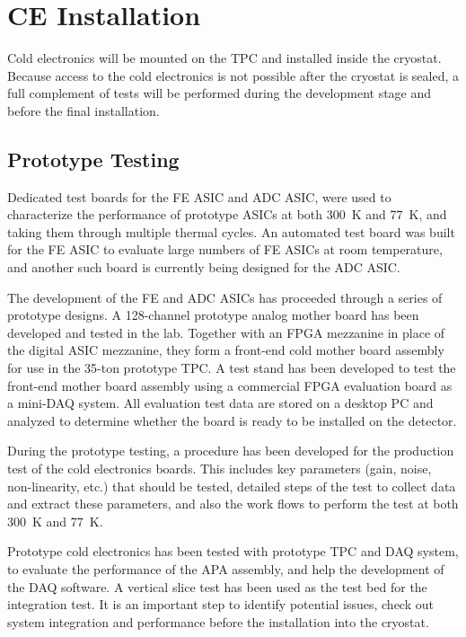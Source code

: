 %
\section{CE Installation}
\label{sec:ce_install}

Cold electronics will be mounted on the TPC and installed inside the cryostat.
Because access to the cold electronics is not possible after the cryostat is sealed,
a full complement of tests will be performed during the development stage and before the final installation.

\subsection{Prototype Testing}
\label{sec:ce_install_proto}

Dedicated test boards for the FE ASIC and ADC ASIC,
were used to characterize the performance of prototype ASICs at both 300~K and 77~K,
and taking them through multiple thermal cycles.
An automated test board was built for the FE ASIC to evaluate large numbers of FE ASICs at room temperature,
and another such board is currently being designed for the ADC ASIC.

The development of the FE and ADC ASICs has proceeded through a series of prototype designs.
A 128-channel prototype analog mother board has been developed and tested in the lab.
Together with an FPGA mezzanine in place of the digital ASIC mezzanine,
they form a front-end cold mother board assembly for use in the 35-ton prototype TPC.
A test stand has been developed to test the front-end mother board assembly
using a commercial FPGA evaluation board as a mini-DAQ system.
All evaluation test data are stored on a desktop PC and analyzed to
determine whether the board is ready to be installed on the detector.

During the prototype testing, a procedure has been developed for the production test of the cold electronics boards.
This includes key parameters (gain, noise, non-linearity, etc.) that should be tested,
detailed steps of the test to collect data and extract these parameters,
and also the work flows to perform the test at both 300~K and 77~K.

Prototype cold electronics has been tested with prototype TPC and DAQ system,
to evaluate the performance of the APA assembly, and help the development of the DAQ software.
A vertical slice test has been used as the test bed for the integration test.
It is an important step to identify potential issues, check out system integration and performance
before the installation into the cryostat.

